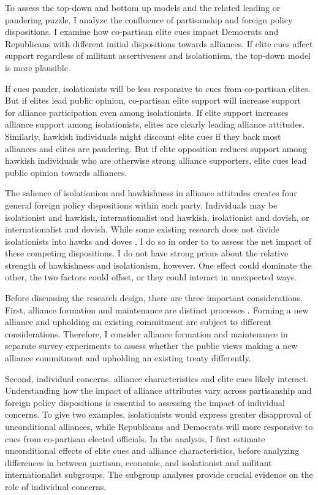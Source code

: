 \documentclass[12pt]{article}
\begin{document}
To assess the top-down and bottom up models and the related leading or pandering puzzle, I analyze the confluence of partisanship and foreign policy dispositions.
I examine how co-partisan elite cues impact Democrats and Republicans with different initial dispositions towards alliances. 
If elite cues affect support regardless of militant assertiveness and isolationism, the top-down model is more plausible. 


If cues pander, isolationists will be less responsive to cues from co-partisan elites.
But if elites lead public opinion, co-partisan elite support will increase support for alliance participation even among isolationists. 
If elite support increases alliance support among isolationists, elites are clearly leading alliance attitudes. 
Similarly, hawkish individuals might discount elite cues if they back most alliances and elites are pandering. 
But if elite opposition reduces support among hawkish individuals who are otherwise strong alliance supporters, elite cues lead public opinion towards alliances. 


The salience of isolationism and hawkishness in alliance attitudes creates four general foreign policy dispositions within each party. 
Individuals may be isolationist and hawkish, internationalist and hawkish, isolationist and dovish, or internationalist and dovish.
While some existing research does not divide isolationists into hawks and doves \citep{Kertzeretal2014}, I do so in order to to assess the net impact of these competing dispositions.   
I do not have strong priors about the relative strength of hawkishness and isolationism, however.
One effect could dominate the other, the two factors could offset, or they could interact in unexpected ways.


Before discussing the research design, there are three important considerations. 
First, alliance formation and maintenance are distinct processes \citep{Snyder1997}. 
Forming a new alliance and upholding an existing commitment are subject to different considerations.
Therefore, I consider alliance formation and maintenance in separate survey experiments to assess whether the public views making a new alliance commitment and upholding an existing treaty differently. 


Second, individual concerns, alliance characteristics and elite cues likely interact. 
Understanding how the impact of alliance attributes vary across partisanship and foreign policy dispositions is essential to assessing the impact of individual concerns. 
To give two examples, isolationists would express greater disapproval of unconditional alliances, while Republicans and Democrats will more responsive to cues from co-partisan elected officials. 
In the analysis, I first estimate unconditional effects of elite cues and alliance characteristics, before analyzing differences in between partisan, economic, and isolationist and militant internationalist subgroups. 
The subgroup analyses provide crucial evidence on the role of individual concerns. 
\end{document}
